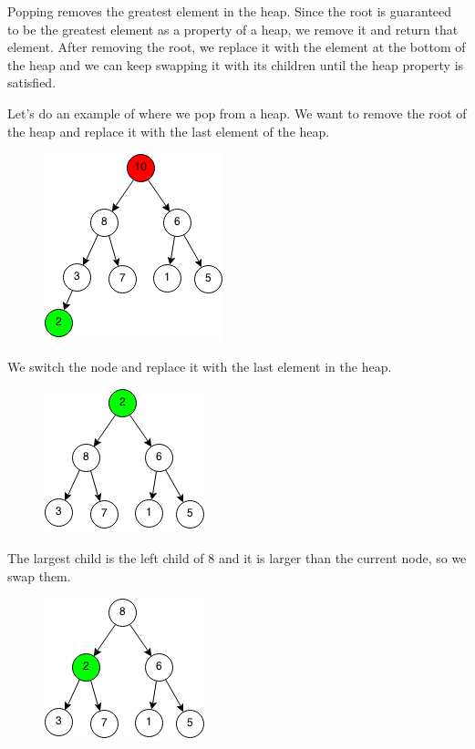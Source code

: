 \documentclass[11pt,oneside]{book}
\makeatletter
\def\maxwidth#1{\ifdim\Gin@nat@width>#1 #1\else\Gin@nat@width\fi}
\makeatother
\begin{document}
Popping removes the greatest element in the heap. Since the root is guaranteed to be the greatest element as a property of a heap, we remove it and return that element. After removing the root, we replace it with the element at the bottom of the heap and we can keep swapping it with its children until the heap property is satisfied.

Let's do an example of where we pop from a heap. We want to remove the root of the heap and replace it with the last element of the heap.

\vspace{5px}\begin{figure}[H]\centering
        \includegraphics[width=0.66\maxwidth{\textwidth}]{maxheappop.png}
        \end{figure}

We switch the node and replace it with the last element in the heap.

\vspace{5px}\begin{figure}[H]\centering
        \includegraphics[width=0.66\maxwidth{\textwidth}]{maxheappop1.png}
        \end{figure}

The largest child is the left child of 8 and it is larger than the current node, so we swap them.

\vspace{5px}\begin{figure}[H]\centering
        \includegraphics[width=0.66\maxwidth{\textwidth}]{maxheappop2.png}
        \end{figure}
\end{document}
